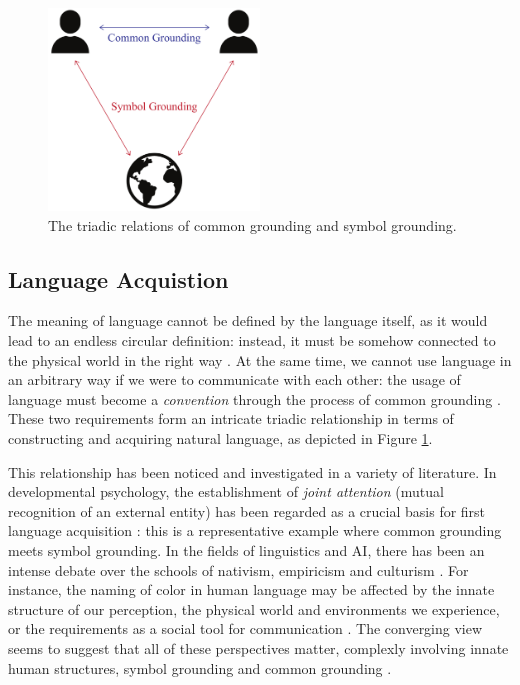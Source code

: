 \begin{figure}[t!]
\centering
\includegraphics[width=0.5\textwidth]{triadic_relations.pdf}
\caption{The triadic relations of common grounding and symbol grounding.
}
\label{02_fig:triadic_relations}
\end{figure}

\subsection{Language Acquistion}
\label{02_subsec:language_acquisition}

The meaning of language cannot be defined by the language itself, as it would lead to an endless circular definition: instead, it must be somehow connected to the physical world in the right way \citep{harnad1990symbol}. At the same time, we cannot use language in an arbitrary way if we were to communicate with each other: the usage of language must become a \textit{convention} through the process of common grounding \citep{lewis1969convention}. These two requirements form an intricate triadic relationship in terms of constructing and acquiring natural language, as depicted in Figure \ref{02_fig:triadic_relations}.

This relationship has been noticed and investigated in a variety of literature. In developmental psychology, the establishment of \textit{joint attention} (mutual recognition of an external entity) has been regarded as a crucial basis for first language acquisition \citep{clark2001grounding,tomasello2009constructing}: this is a representative example where common grounding meets symbol grounding. In the fields of linguistics and AI, there has been an intense debate over the schools of nativism, empiricism and culturism \citep{Chomsky1957-CHOSS-2,elman1996rethinking,steels1997synthetic}. For instance, the naming of color in human language may be affected by the innate structure of our perception, the physical world and environments we experience, or the requirements as a social tool for communication \citep{Steels2005coordinatingPG}. The converging view seems to suggest that all of these perspectives matter, complexly involving innate human structures, symbol grounding and common grounding \citep{larsson2018grounding}.

